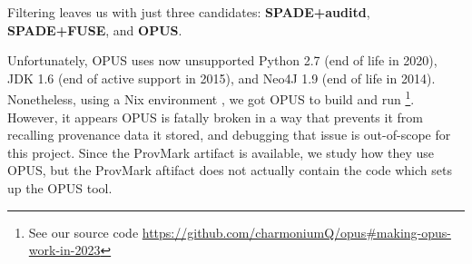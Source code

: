 Filtering leaves us with just three candidates: \textbf{SPADE+auditd}, \textbf{SPADE+FUSE}, and \textbf{OPUS}.

Unfortunately, OPUS uses now unsupported Python 2.7 (end of life in 2020), JDK 1.6 (end of active support in 2015), and Neo4J 1.9 (end of life in 2014).
Nonetheless, using a Nix environment \cite{dolstra_purely_2006}, we got OPUS to build and run \footnote{See our source code \url{https://github.com/charmoniumQ/opus\#making-opus-work-in-2023}}.
However, it appears OPUS is fatally broken in a way that prevents it from recalling provenance data it stored, and debugging that issue is out-of-scope for this project.
Since the ProvMark artifact is available, we study how they use OPUS, but the ProvMark aftifact does not actually contain the code which sets up the OPUS tool.






